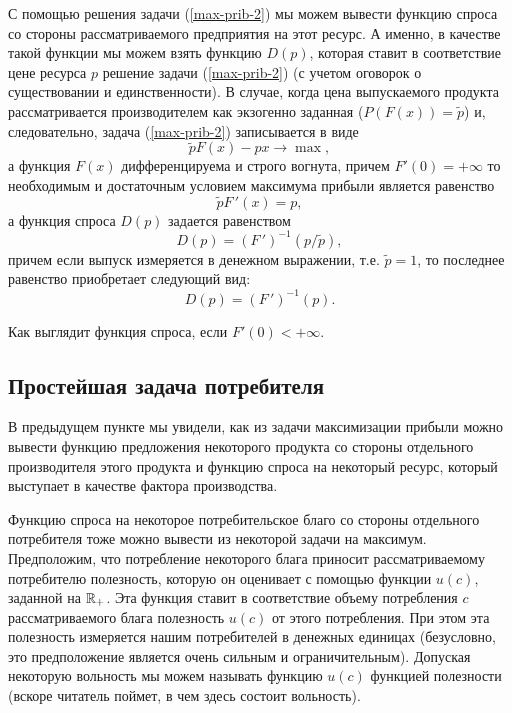     С помощью решения задачи
    (\ref{max-prib-2}) мы можем вывести
    функцию спроса со стороны рассматриваемого предприятия на этот
    ресурс. А именно, в качестве такой функции мы можем взять
    функцию $D(p)$, которая ставит в соответствие цене ресурса
    $p$ решение задачи (\ref{max-prib-2}) (с учетом оговорок о
    существовании и единственности). В случае, когда цена выпускаемого
    продукта рассматривается производителем как экзогенно заданная
    ($P(F(x))=\tilde{p}$) и, следовательно, задача (\ref{max-prib-2})
    записывается в виде
    \begin{equation}
\label{max-prib-3}
    \tilde{p}F(x)-px\rightarrow\max,
\end{equation}
    а функция $F(x)$ дифференцируема и строго вогнута,
    причем $F'(0)=+\infty$ то необходимым и
    достаточным условием максимума прибыли является равенство
    \[\tilde{p}F\,'(x)=p,\]
    а функция спроса $D(p)$ задается равенством
    \[D(p)=(F\,')^{-1}(p/\tilde{p}),\]
    причем если выпуск измеряется в денежном выражении, т.е. $\tilde{p}=1$,
    то последнее равенство приобретает следующий вид:
    \[D(p)=(F\,')^{-1}(p).\]

\begin{exer}
    Как выглядит функция спроса, если $F'(0)<+\infty$.
\end{exer}




\subsection{Простейшая задача потребителя}
    В предыдущем пункте мы увидели, как из задачи максимизации
    прибыли можно вывести функцию предложения некоторого продукта со
    стороны отдельного производителя этого продукта и
    функцию спроса на некоторый ресурс, который выступает в качестве
    фактора производства.

    Функцию спроса на некоторое потребительское благо со стороны отдельного
    потребителя тоже можно вывести из некоторой задачи на максимум.
    Предположим, что потребление некоторого блага
    приносит рассматриваемому потребителю полезность, которую он
    оценивает с помощью функции $u(c)$, заданной на $\mathbb{R}_{+}$. Эта функция
    ставит  в соответствие объему потребления $c$ рассматриваемого
    блага полезность $u(c)$ от этого потребления. При этом эта полезность
    измеряется нашим потребителей в денежных единицах (безусловно,
    это предположение является очень сильным и ограничительным).
    Допуская некоторую вольность мы можем называть функцию $u(c)$
    функцией полезности (вскоре читатель поймет, в чем здесь состоит
    вольность).


